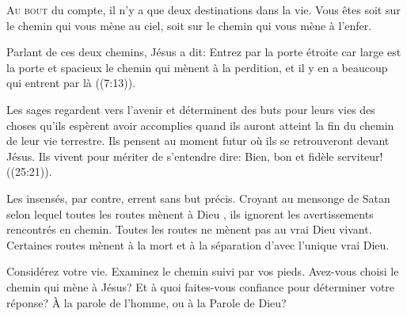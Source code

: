 



\lettrine{A}{u bout} du compte, il n'y a que deux destinations dans la vie.
 Vous êtes soit sur le chemin qui vous mène au ciel,
 soit sur le chemin qui vous mène à l'enfer.

Parlant de ces deux chemins, Jésus a dit: 
 \Og Entrez par la porte étroite car large est la porte et spacieux le chemin
 qui mènent à la perdition,
 et il y en a beaucoup qui entrent par là \Fg{}
 ((7:13)).


Les sages regardent vers l'avenir et déterminent des buts pour leurs vies
 \ocadr des choses qu'ils espèrent avoir accomplies quand ils auront atteint
 la fin du chemin de leur vie terrestre.
 Ils pensent au moment futur où ils se retrouveront devant Jésus.
 Ils vivent pour mériter de s'entendre dire: 
 \Og Bien, bon et fidèle serviteur! \Fg{} ((25:21)).

Les insensés, par contre, errent sans but précis.
 Croyant au mensonge de Satan selon lequel
 \Og toutes les routes mènent à Dieu \Fg{},
 ils ignorent les avertissements rencontrés en chemin.
 Toutes les routes ne mènent pas au vrai Dieu vivant.
 Certaines routes mènent à la mort
 \ocadr et à la séparation d'avec l'unique vrai Dieu.

Considérez votre vie. Examinez le chemin suivi par vos pieds.
 Avez-vous choisi le chemin qui mène à Jésus?
 Et à quoi faites-vous confiance pour déterminer votre réponse?
 À la parole de l'homme, ou à la Parole de Dieu?

\dvrule


